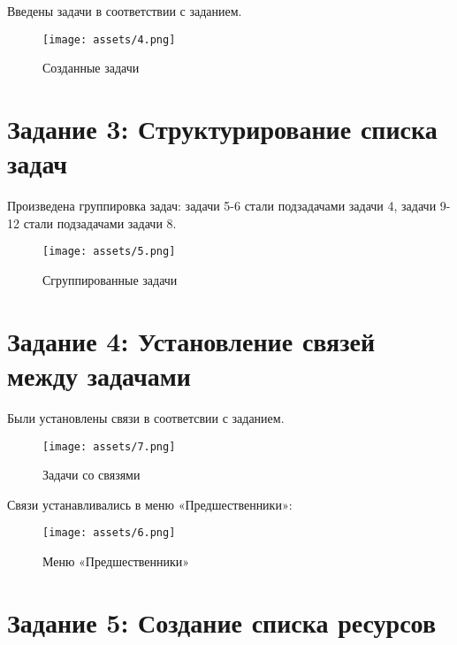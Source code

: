 Введены задачи в соответствии с заданием.

\begin{figure}[H]
    \begin{center}
    \texttt{[image: assets/4.png]}
    \caption{Созданные задачи}
    \label{fig:4}
    \end{center}
\end{figure}

\section{Задание 3: Структурирование списка задач}

Произведена группировка задач: задачи 5-6 стали подзадачами задачи 4, задачи 9-12 стали подзадачами задачи 8.

\begin{figure}[H]
    \begin{center}
    \texttt{[image: assets/5.png]}
    \caption{Сгруппированные задачи}
    \label{fig:5}
    \end{center}
\end{figure}

\section{Задание 4: Установление связей между задачами}

Были установлены связи в соответсвии с заданием. 

\begin{figure}[H]
    \begin{center}
    \texttt{[image: assets/7.png]}
    \caption{Задачи со связями}
    \label{fig:7}
    \end{center}
\end{figure}


Связи устанавливались в меню «Предшественники»:

\begin{figure}[H]
    \begin{center}
    \texttt{[image: assets/6.png]}
    \caption{Меню «Предшественники»}
    \label{fig:6}
    \end{center}
\end{figure}

\section{Задание 5: Создание списка ресурсов}

